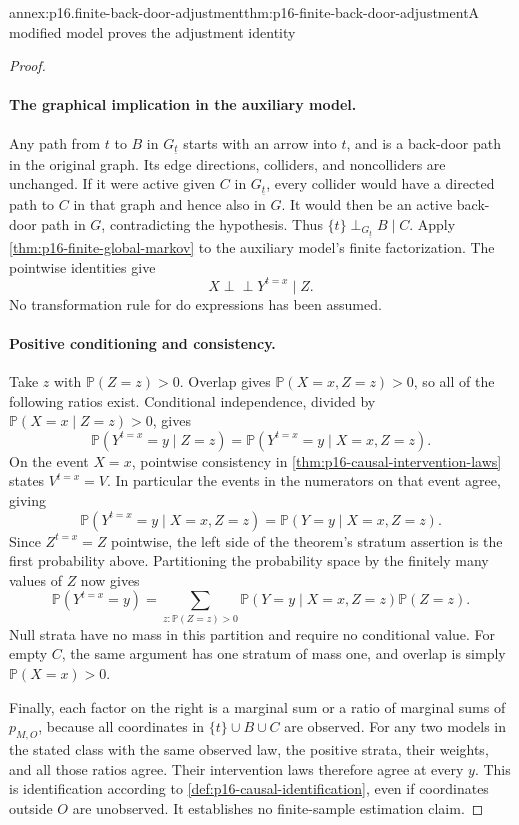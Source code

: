 \begin{annexitem}{annex:p16.finite-back-door-adjustment}{thm:p16-finite-back-door-adjustment}{A modified model proves the adjustment identity}
\begin{proof}
\paragraph{The graphical implication in the auxiliary model.}
Any path from \(t\) to \(B\) in \(G_{\underline t}\) starts
with an arrow into \(t\), and is a back-door path in the original
graph. Its edge directions, colliders, and noncolliders are unchanged.
If it were active given \(C\) in \(G_{\underline t}\), every
collider would have a directed path to \(C\) in that graph and
hence also in \(G\). It would then be an active back-door path
in \(G\), contradicting the hypothesis. Thus
\(\{t\}\mathrel{\perp_{G_{\underline t}}}B\mid C\).
Apply \cref{thm:p16-finite-global-markov} to the auxiliary model's
finite factorization. The pointwise identities give
\[
 X\mathrel{\perp\!\!\!\perp}Y^{t=x}\mid Z.
\]
No transformation rule for do expressions has been assumed.

\paragraph{Positive conditioning and consistency.}
Take \(z\) with \(\mathbb P(Z=z)>0\). Overlap gives
\(\mathbb P(X=x,Z=z)>0\), so all of the following ratios exist.
Conditional independence, divided by
\(\mathbb P(X=x\mid Z=z)>0\), gives
\[
 \mathbb P(Y^{t=x}=y\mid Z=z)
   =\mathbb P(Y^{t=x}=y\mid X=x,Z=z).
\]
On the event \(X=x\), pointwise consistency in
\cref{thm:p16-causal-intervention-laws} states
\(V^{t=x}=V\). In particular the events in the numerators on
that event agree, giving
\[
 \mathbb P(Y^{t=x}=y\mid X=x,Z=z)
    =\mathbb P(Y=y\mid X=x,Z=z).
\]
Since \(Z^{t=x}=Z\) pointwise, the left side of the theorem's
stratum assertion is the first probability above. Partitioning the
probability space by the finitely many values of \(Z\) now gives
\[
 \mathbb P(Y^{t=x}=y)
 =\sum_{z:\mathbb P(Z=z)>0}
       \mathbb P(Y=y\mid X=x,Z=z)\mathbb P(Z=z).
\]
Null strata have no mass in this partition and require no conditional
value. For empty \(C\), the same argument has one stratum of mass
one, and overlap is simply \(\mathbb P(X=x)>0\).

Finally, each factor on the right is a marginal sum or a ratio of
marginal sums of \(p_{M,O}\), because all coordinates in
\(\{t\}\cup B\cup C\) are observed. For any two models in the
stated class with the same observed law, the positive strata, their
weights, and all those ratios agree. Their intervention laws therefore
agree at every \(y\). This is identification according to
\cref{def:p16-causal-identification}, even if coordinates outside
\(O\) are unobserved. It establishes no finite-sample estimation
claim.
\end{proof}
\end{annexitem}

